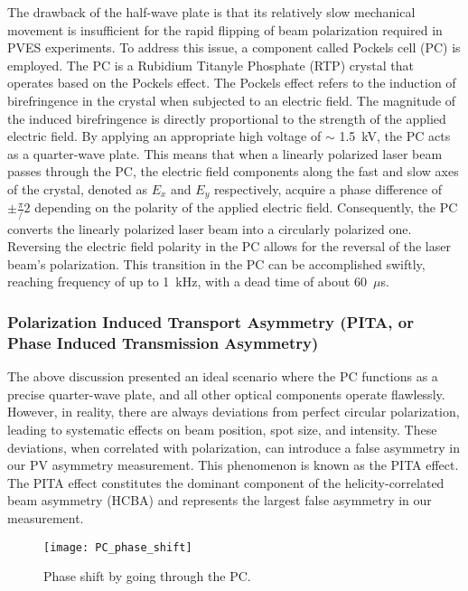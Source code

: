 The drawback of the half-wave plate is that its relatively slow mechanical movement 
is insufficient for the rapid flipping of beam polarization required in PVES experiments.
To address this issue, a component called Pockels cell (PC) is employed.
The PC is a Rubidium Titanyle Phosphate (RTP) crystal that operates based on the Pockels effect. 
The Pockels effect refers to the induction of birefringence in the crystal when subjected to an electric field. The magnitude of the induced birefringence is directly proportional to the strength of the applied electric field. By applying an appropriate high voltage of $\sim$ 1.5~kV, %
the PC acts as a quarter-wave plate. This means that when a linearly polarized laser beam passes through the PC, the electric field components along the fast and slow axes of the crystal, denoted as $E_x$ and $E_y$ respectively, acquire a phase difference of $\pm \frac{\pi}/2$ depending on the polarity of the applied electric field. Consequently, the PC converts the linearly polarized laser beam into a circularly polarized one. Reversing the electric field polarity in the PC allows for the reversal of the laser beam's polarization. This transition in the PC can be accomplished swiftly, reaching frequency of up to 1~kHz, with a dead time of about 60~$\mu$s. 

\subsubsection{Polarization Induced Transport Asymmetry (PITA, or Phase Induced Transmission Asymmetry) \cite{Caryn2019}}
The above discussion presented an ideal scenario where the PC functions as a precise quarter-wave
plate, and all other optical components operate flawlessly. However, in reality, there are always deviations from perfect circular polarization, leading to systematic effects on beam position, spot size, and intensity.
These deviations, when correlated with polarization, can introduce a false asymmetry in our PV asymmetry measurement. This phenomenon is known as the PITA effect. The PITA effect constitutes the dominant component of the helicity-correlated beam asymmetry (HCBA) and represents the largest false asymmetry in our measurement.

\begin{figure}[!h]
    \centering
    \texttt{[image: PC\_phase\_shift]}
    \caption{Phase shift by going through the PC.}
    \label{fig:pc_phase_shift}
\end{figure}

